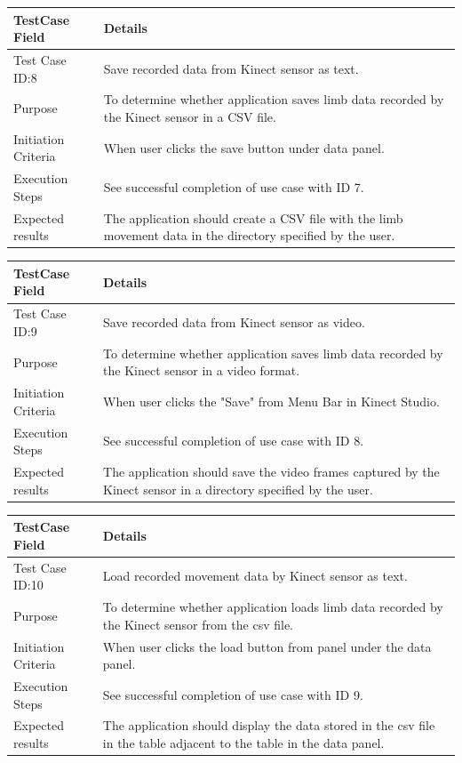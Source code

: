\documentclass[a4paper, 12pt]{article}
\begin{document}
\begin{table}[!htb]
 \begin{tabular}{|p{4cm}|p{10cm}|}
 \hline
  TestCase Field & Details \\
  \hline
   Test Case ID:8 & Save recorded data from Kinect sensor as text. \\
  \hline 
   Purpose & To determine whether application saves limb data recorded by the Kinect sensor in a CSV file. \\
  \hline
   Initiation Criteria & When user clicks the save button under data panel.  \\
  \hline
   Execution Steps & See successful completion of use case with ID 7.  \\
  \hline
   Expected results & The application should create a CSV file with the limb movement data in the directory specified by the user. \\
  \hline
 \end{tabular}
\end{table}

\begin{table}[!htb]
 \begin{tabular}{|p{4cm}|p{10cm}|}
 \hline
  TestCase Field & Details \\
  \hline
   Test Case ID:9 & Save recorded data from Kinect sensor as video. \\
  \hline 
   Purpose & To determine whether application saves limb data recorded by the Kinect sensor in a video format. \\
  \hline
   Initiation Criteria & When user clicks the "Save" from Menu Bar in Kinect Studio.  \\
  \hline
   Execution Steps & See successful completion of use case with ID 8.  \\
  \hline
   Expected results & The application should save the video frames captured by the Kinect sensor in a directory specified by the user. \\
  \hline
 \end{tabular}
\end{table}

\begin{table}[!htb]
 \begin{tabular}{|p{4cm}|p{10cm}|}
 \hline
  TestCase Field & Details \\
  \hline
   Test Case ID:10 & Load recorded movement data by Kinect sensor as text. \\
  \hline 
   Purpose & To determine whether application loads limb data recorded by the Kinect sensor from the csv file. \\
  \hline
   Initiation Criteria & When user clicks the load button from panel under the data panel.  \\
  \hline
   Execution Steps & See successful completion of use case with ID 9.  \\
  \hline
   Expected results & The application should display the data stored in the csv file in the table adjacent to the table in the data panel. \\
  \hline
 \end{tabular}
\end{table}
\end{document}
